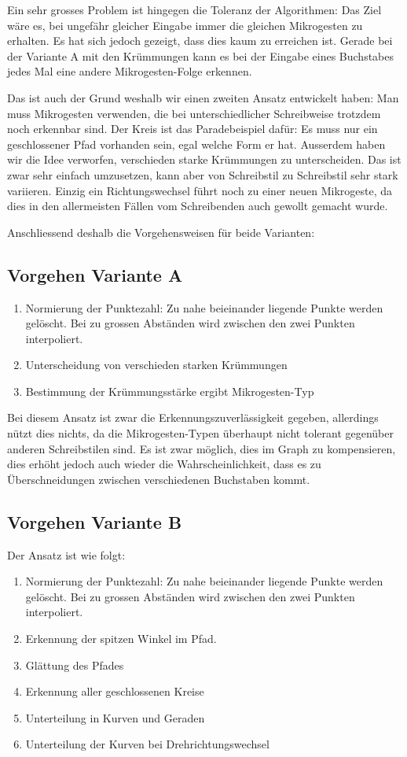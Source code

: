 Ein sehr grosses Problem ist hingegen die Toleranz der Algorithmen: Das Ziel wäre es, bei ungefähr gleicher Eingabe immer die gleichen Mikrogesten zu erhalten. Es hat sich jedoch gezeigt, dass dies kaum zu erreichen ist. Gerade bei der Variante A mit den Krümmungen kann es bei der Eingabe eines Buchstabes jedes Mal eine andere Mikrogesten-Folge erkennen. 

Das ist auch der Grund weshalb wir einen zweiten Ansatz entwickelt haben: Man muss Mikrogesten verwenden, die bei unterschiedlicher Schreibweise trotzdem noch erkennbar sind. Der Kreis ist das Paradebeispiel dafür: Es muss nur ein geschlossener Pfad vorhanden sein, egal welche Form er hat. Ausserdem haben wir die Idee verworfen, verschieden starke Krümmungen zu unterscheiden. Das ist zwar sehr einfach umzusetzen, kann aber von Schreibstil zu Schreibstil sehr stark variieren. Einzig ein Richtungswechsel führt noch zu einer neuen Mikrogeste, da dies in den allermeisten Fällen vom Schreibenden auch gewollt gemacht wurde.

Anschliessend deshalb die Vorgehensweisen für beide Varianten:

\subsection{Vorgehen Variante A}
\begin{enumerate}
	\item Normierung der Punktezahl: Zu nahe beieinander liegende Punkte werden gelöscht. Bei zu grossen Abständen wird zwischen den zwei Punkten interpoliert.
	\item Unterscheidung von verschieden starken Krümmungen
	\item Bestimmung der Krümmungsstärke ergibt Mikrogesten-Typ
\end{enumerate}

Bei diesem Ansatz ist zwar die Erkennungszuverlässigkeit gegeben, allerdings nützt dies nichts, da die Mikrogesten-Typen überhaupt nicht tolerant gegenüber anderen Schreibstilen sind. Es ist zwar möglich, dies im Graph zu kompensieren, dies erhöht jedoch auch wieder die Wahrscheinlichkeit, dass es zu Überschneidungen zwischen verschiedenen Buchstaben kommt.

\subsection{Vorgehen Variante B}
Der Ansatz ist wie folgt:
\begin{enumerate}
	\item Normierung der Punktezahl: Zu nahe beieinander liegende Punkte werden gelöscht. Bei zu grossen Abständen wird zwischen den zwei Punkten interpoliert.
	\item Erkennung der spitzen Winkel im Pfad.
	\item Glättung des Pfades
	\item Erkennung aller geschlossenen Kreise 
	\item Unterteilung in Kurven und Geraden
	\item Unterteilung der Kurven bei Drehrichtungswechsel
\end{enumerate}

